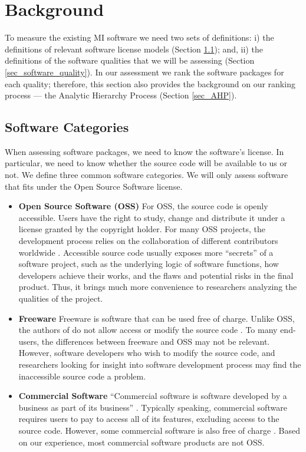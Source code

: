 \documentclass[final, 3p, times, authoryear]{elsarticle}
\begin{document}
\section{Background} \label{ch_background}

To measure the existing MI software we need two sets of definitions: i) the
definitions of relevant software license models (Section
\ref{sec_software_categories}); and, ii) the definitions of the software
qualities that we will be assessing (Section \ref{sec_software_quality}). In our
assessment we rank the software packages for each quality; therefore, this
section also provides the background on our ranking process --- the Analytic
Hierarchy Process (Section \ref{sec_AHP}).

\subsection{Software Categories} \label{sec_software_categories}

When assessing software packages, we need to know the software's license.  In
particular, we need to know whether the source code will be available to us or
not.  We define three common software categories.  We will only assess software
that fits under the Open Source Software license.

\begin{itemize}

\item \textbf{Open Source Software (OSS)} For OSS, the source code is openly
accessible. Users have the right to study, change and distribute it under a
license granted by the copyright holder. For many OSS projects, the development
process relies on the collaboration of different contributors worldwide
\citep{Corbly2014}. Accessible source code usually exposes more ``secrets'' of a
software project, such as the underlying logic of software functions, how
developers achieve their works, and the flaws and potential risks in the final
product. Thus, it brings much more convenience to researchers analyzing the
qualities of the project.

\item \textbf{Freeware} Freeware is software that can be used free of charge.
Unlike OSS, the authors of do not allow access or modify the source code
\citep{LINFO2006}. To many end-users, the differences between freeware and OSS
may not be relevant. However, software developers who wish to modify the source
code, and researchers looking for insight into software development process may
find the inaccessible source code a problem. 

\item \textbf{Commercial Software} ``Commercial software is software developed
by a business as part of its business'' \citep{GNU2019}. Typically speaking, commercial software requires users to pay to access all of its features,
excluding access to the source code. However, some commercial software is also
free of charge \citep{GNU2019}. Based on our experience, most commercial
software products are not OSS.

\end{itemize}
\end{document}
